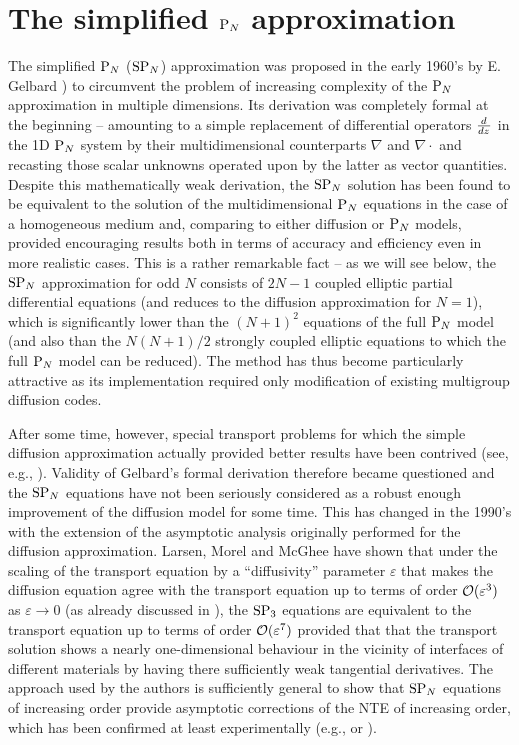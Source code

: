 \chapter{The simplified $\PN$ approximation}\label{chap:SPN}

The simplified $\PN$ ($\SPN$) approximation was proposed in the early 1960's by E. Gelbard \cite{Gelbard1,Gelbard2}) to
circumvent the problem of increasing complexity of the $\PN$ approximation in multiple dimensions. Its derivation was
completely formal at the beginning -- amounting to a simple replacement of differential operators $\textstyle\der{}{z}$
in the 1D $\PN$ system by their multidimensional counterparts $\nabla$ and $\nabla\cdot$ and recasting those scalar
unknowns operated upon by the latter as vector quantities.
Despite this mathematically weak derivation, the $\SPN$ solution has been found to be equivalent to the solution of the
multidimensional $\PN$ equations in the case of a homogeneous medium and, comparing to either diffusion or $\PN$ models,
provided encouraging results both in terms of accuracy and efficiency even in more realistic cases. This is a rather
remarkable fact -- as we will see below, the $\SPN$ approximation for odd $N$ consists of $2N-1$ coupled elliptic
partial differential equations (and reduces to the diffusion approximation for $N = 1$), which is significantly lower
than the $(N+1)^2$ equations of the full $\PN$ model (and also than the $N(N+1)/2$ strongly coupled elliptic equations
to which the full $\PN$ model can be reduced). The method has thus become particularly attractive as its implementation
required only modification of existing multigroup diffusion codes.

After some time, however, special transport problems for which the simple diffusion
approximation actually provided better results have been contrived (see, e.g., \cite[p. 247]{Coppa1}). Validity of
Gelbard's formal derivation therefore became questioned and the $\SPN$ equations have not been seriously considered as 
a robust enough improvement of the diffusion model for some time. This has changed in the 1990's with the extension of
the asymptotic analysis originally performed for the diffusion approximation. Larsen, Morel and McGhee
\cite{Larsen1} have shown that under the scaling of the transport equation by a ``diffusivity'' parameter $\varepsilon$
that makes the diffusion equation agree with the transport equation up to terms of order $\Oh(\varepsilon^3)$ as 
$\varepsilon \to 0$ (as already discussed in ), the $\SPN[3]$ equations are
equivalent to the transport equation up to terms of order $\Oh(\varepsilon^7)$ provided that that the transport solution shows a nearly 
one-dimensional behaviour in the vicinity of interfaces of different materials by having there sufficiently weak
tangential derivatives. The approach used by the authors is sufficiently general to show
that $\SPN$ equations of increasing order provide asymptotic corrections of the NTE of increasing order, which has been
confirmed at least experimentally (e.g., \cite{Olbrant} or \cite{McClarren1}).

